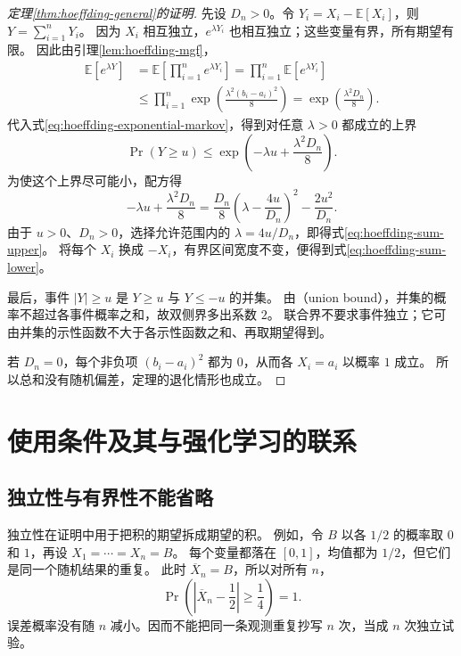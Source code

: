 \documentclass[UTF8]{ctexart}
\begin{document}
\begin{proof}[定理\ref{thm:hoeffding-general}的证明]
先设 $D_n>0$。令 $Y_i=X_i-\mathbb E[X_i]$，则 $Y=\sum_{i=1}^{n}Y_i$。
因为 $X_i$ 相互独立，$e^{\lambda Y_i}$ 也相互独立；这些变量有界，所有期望有限。
因此由引理\ref{lem:hoeffding-mgf}，
\begin{align*}
  \mathbb E[e^{\lambda Y}]
  &=\mathbb E\!\left[\prod_{i=1}^{n}e^{\lambda Y_i}\right]
   =\prod_{i=1}^{n}\mathbb E[e^{\lambda Y_i}]\\
  &\leq\prod_{i=1}^{n}
    \exp\!\left(\frac{\lambda^2(b_i-a_i)^2}{8}\right)
   =\exp\!\left(\frac{\lambda^2D_n}{8}\right).
\end{align*}
代入式\eqref{eq:hoeffding-exponential-markov}，得到对任意 $\lambda>0$ 都成立的上界
\[
  \Pr(Y\geq u)\leq
  \exp\!\left(-\lambda u+\frac{\lambda^2D_n}{8}\right).
\]
为使这个上界尽可能小，配方得
\[
  -\lambda u+\frac{\lambda^2D_n}{8}
  =\frac{D_n}{8}\left(\lambda-\frac{4u}{D_n}\right)^2
   -\frac{2u^2}{D_n}.
\]
由于 $u>0$、$D_n>0$，选择允许范围内的 $\lambda=4u/D_n$，即得式\eqref{eq:hoeffding-sum-upper}。
将每个 $X_i$ 换成 $-X_i$，有界区间宽度不变，便得到式\eqref{eq:hoeffding-sum-lower}。

最后，事件 $|Y|\geq u$ 是 $Y\geq u$ 与 $Y\leq-u$ 的并集。
由（union bound），并集的概率不超过各事件概率之和，故双侧界多出系数 $2$。
联合界不要求事件独立；它可由并集的示性函数不大于各示性函数之和、再取期望得到。

若 $D_n=0$，每个非负项 $(b_i-a_i)^2$ 都为 $0$，从而各 $X_i=a_i$ 以概率 $1$ 成立。
所以总和没有随机偏差，定理的退化情形也成立。
\end{proof}

\section{使用条件及其与强化学习的联系}
\label{sec:hoeffding-scope}

\subsection{独立性与有界性不能省略}

独立性在证明中用于把积的期望拆成期望的积。
例如，令 $B$ 以各 $1/2$ 的概率取 $0$ 和 $1$，再设 $X_1=\cdots=X_n=B$。
每个变量都落在 $[0,1]$，均值都为 $1/2$，但它们是同一个随机结果的重复。
此时 $\overline X_n=B$，所以对所有 $n$，
\[
  \Pr\!\left(\left|\overline X_n-\frac12\right|\geq\frac14\right)=1.
\]
误差概率没有随 $n$ 减小。因而不能把同一条观测重复抄写 $n$ 次，当成 $n$ 次独立试验。
\end{document}
